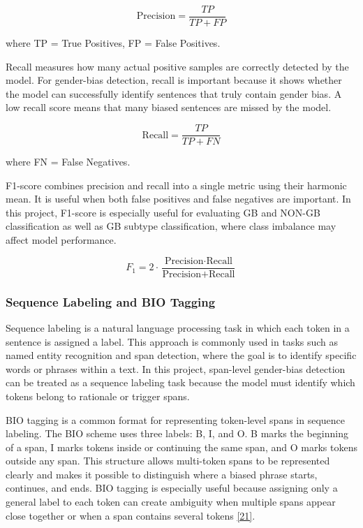 \documentclass[12pt,oneside,openright,a4paper]{cpe-english-project}
\begin{document}
\[\text{Precision} = \frac{TP}{TP + FP}\]

where TP = True Positives, FP = False Positives.

Recall measures how many actual positive samples are correctly detected by the model. For gender-bias detection, recall is important because it shows whether the model can successfully identify sentences that truly contain gender bias. A low recall score means that many biased sentences are missed by the model.

\[\text{Recall} = \frac{TP}{TP + FN}\]

where FN = False Negatives.

F1-score combines precision and recall into a single metric using their harmonic mean. It is useful when both false positives and false negatives are important. In this project, F1-score is especially useful for evaluating GB and NON-GB classification as well as GB subtype classification, where class imbalance may affect model performance.

\[F_1 = 2 \cdot \frac{\text{Precision} \cdot \text{Recall}}{\text{Precision} + \text{Recall}}\]

\subsubsection{Sequence Labeling and BIO Tagging}

Sequence labeling is a natural language processing task in which each token in a sentence is assigned a label. This approach is commonly used in tasks such as named entity recognition and span detection, where the goal is to identify specific words or phrases within a text. In this project, span-level gender-bias detection can be treated as a sequence labeling task because the model must identify which tokens belong to rationale or trigger spans.

BIO tagging is a common format for representing token-level spans in sequence labeling. The BIO scheme uses three labels: B, I, and O. B marks the beginning of a span, I marks tokens inside or continuing the same span, and O marks tokens outside any span. This structure allows multi-token spans to be represented clearly and makes it possible to distinguish where a biased phrase starts, continues, and ends. BIO tagging is especially useful because assigning only a general label to each token can create ambiguity when multiple spans appear close together or when a span contains several tokens \hyperlink{bib:ref21}{[21]}.
\end{document}
